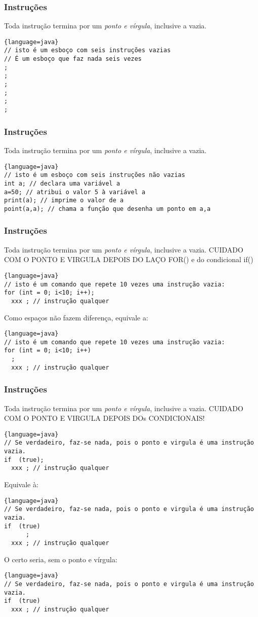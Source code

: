\documentclass{beamer}
\begin{document}
\begin{frame}[fragile]
\frametitle{Instruções}
Toda instrução termina por um \emph{ponto e vírgula}, inclusive a vazia. 
\begin{lstlisting}{language=java}
// isto é um esboço com seis instruções vazias 	
// É um esboço que faz nada seis vezes
;
;
;
;
;
;
\end{lstlisting}
\end{frame}


\begin{frame}[fragile]
\frametitle{Instruções}
Toda instrução termina por um \emph{ponto e vírgula}, inclusive a vazia. 
\begin{lstlisting}{language=java}
// isto é um esboço com seis instruções não vazias 	
int a; // declara uma variável a
a=50; // atribui o valor 5 à variável a
print(a); // imprime o valor de a
point(a,a); // chama a função que desenha um ponto em a,a 
\end{lstlisting}
\end{frame}


\begin{frame}[fragile]
\frametitle{Instruções}
Toda instrução termina por um \emph{ponto e vírgula}, inclusive a vazia. 
CUIDADO COM O PONTO E VIRGULA DEPOIS DO LAÇO FOR(){} e do condicional if(){}
\begin{lstlisting}{language=java}
// isto é um comando que repete 10 vezes uma instrução vazia:
for (int = 0; i<10; i++);
  xxx ; // instrução qualquer
\end{lstlisting}
Como espaços não fazem diferença, equivale a:
\begin{lstlisting}{language=java}
// isto é um comando que repete 10 vezes uma instrução vazia:
for (int = 0; i<10; i++)
  ;
  xxx ; // instrução qualquer
\end{lstlisting}
\end{frame}


\begin{frame}[fragile]
\frametitle{Instruções}
Toda instrução termina por um \emph{ponto e vírgula}, inclusive a vazia. 
{\scriptsize \color{red} CUIDADO COM O PONTO E VIRGULA DEPOIS DOs CONDICIONAIS!}
\begin{lstlisting}{language=java}
// Se verdadeiro, faz-se nada, pois o ponto e virgula é uma instrução vazia.
if  (true);
  xxx ; // instrução qualquer
\end{lstlisting}
Equivale à:
\begin{lstlisting}{language=java}
// Se verdadeiro, faz-se nada, pois o ponto e virgula é uma instrução vazia.
if  (true)
      ;
  xxx ; // instrução qualquer
\end{lstlisting}
O certo seria, sem o ponto e vírgula:
\begin{lstlisting}{language=java}
// Se verdadeiro, faz-se nada, pois o ponto e virgula é uma instrução vazia.
if  (true)
  xxx ; // instrução qualquer
\end{lstlisting}
\end{frame}
\end{document}
